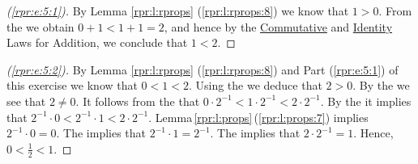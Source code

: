 \begin{proof}[(\ref{rpr:e:5:1})]
	By Lemma \ref{rpr:l:rprops} (\ref{rpr:l:rprops:8}) we know that $1 > 0$. From the  we obtain $0 + 1 < 1 + 1 = 2$, and hence by the \hyperref[rax:d:props:commutative_add]{Commutative} and \hyperref[rax:d:props:identity_add]{Identity} Laws for Addition, we conclude that $1 < 2$.
\end{proof}

\begin{proof}[(\ref{rpr:e:5:2})]
	By Lemma \ref{rpr:l:rprops} (\ref{rpr:l:rprops:8}) and Part (\ref{rpr:e:5:1}) of this exercise we know that $0 < 1 < 2$. Using the  we deduce that $2 > 0$. By the  we see that $2 \neq 0$. It follows from the  that $0 \cdot 2^{-1} < 1 \cdot 2^{-1} < 2 \cdot 2^{-1}$. By the  it implies that $2^{-1} \cdot 0 < 2^{-1} \cdot 1 < 2 \cdot 2^{-1}$. Lemma\,\ref{rpr:l:props}\,(\ref{rpr:l:props:7}) implies $2^{-1} \cdot 0 = 0$. The  implies that $2^{-1} \cdot 1 = 2^{-1}$. The  implies that $2 \cdot 2^{-1} = 1$. Hence, $0 < \frac{1}{2} < 1$.
\end{proof}

